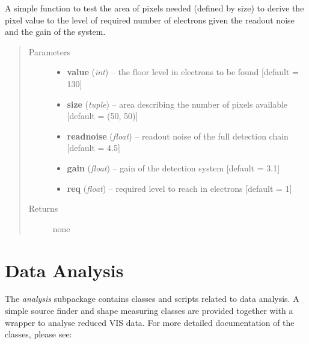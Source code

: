 \documentclass[a4paper,11pt,english]{sphinxmanual}
\begin{document}
\begin{fulllineitems}
\label{reduction:analysis.analyseBackgroundSubtraction.simpleAnalytical}
A simple function to test the area of pixels needed (defined by size) to derive the
pixel value to the level of required number of electrons given the readout noise and
the gain of the system.
\begin{quote}\begin{description}
\item[{Parameters}] \leavevmode\begin{itemize}
\item {} 
\textbf{value} (\emph{int}) -- the floor level in electrons to be found {[}default = 130{]}

\item {} 
\textbf{size} (\emph{tuple}) -- area describing the number of pixels available {[}default = (50, 50){]}

\item {} 
\textbf{readnoise} (\emph{float}) -- readout noise of the full detection chain {[}default = 4.5{]}

\item {} 
\textbf{gain} (\emph{float}) -- gain of the detection system {[}default = 3.1{]}

\item {} 
\textbf{req} (\emph{float}) -- required level to reach in electrons {[}default = 1{]}

\end{itemize}

\item[{Returns}] \leavevmode
none

\end{description}\end{quote}

\end{fulllineitems}



\chapter{Data Analysis}
\label{index:data-analysis}
The \emph{analysis} subpackage contains classes and scripts related to data analysis. A simple source finder and shape
measuring classes are provided together with a wrapper to analyse reduced VIS data. For more detailed
documentation of the classes, please see:
\end{document}
